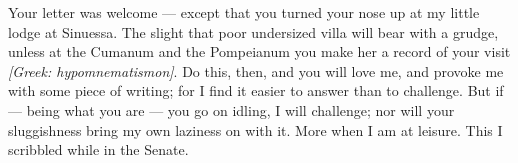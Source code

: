 

 Your letter was welcome --- except that you turned your nose up at my little lodge at Sinuessa. The slight that poor undersized villa will bear with a grudge, unless at the Cumanum and the Pompeianum you make her a record of your visit \textit{[Greek: hypomnematismon]}. Do this, then, and you will love me, and provoke me with some piece of writing; for I find it easier to answer than to challenge. But if --- being what you are --- you go on idling, I will challenge; nor will your sluggishness bring my own laziness on with it. More when I am at leisure. This I scribbled while in the Senate.

